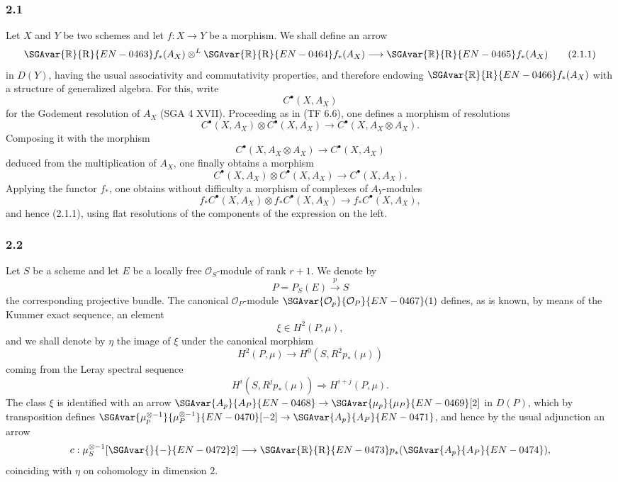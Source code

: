 \subsubsection*{2.1}
Let $X$ and $Y$ be two schemes and let $f:X\to Y$ be a morphism. We shall define an arrow
\[
\SGAvar{\mathbb{R}}{\mathrm{R}}{EN-0463}f_*(A_X)\otimes^L \SGAvar{\mathbb{R}}{\mathrm{R}}{EN-0464}f_*(A_X)\longrightarrow \SGAvar{\mathbb{R}}{\mathrm{R}}{EN-0465}f_*(A_X)
\tag{2.1.1}
\]
in $D(Y)$, having the usual associativity and commutativity properties, and therefore endowing $\SGAvar{\mathbb{R}}{\mathrm{R}}{EN-0466}f_*(A_X)$ with a structure of generalized algebra. For this, write
\[
C^{\bullet}(X,A_X)
\]
for the Godement resolution of $A_X$ (SGA 4 XVII). Proceeding as in (TF 6.6), one defines a morphism of resolutions
\[
C^{\bullet}(X,A_X)\otimes C^{\bullet}(X,A_X)\longrightarrow C^{\bullet}(X,A_X\otimes A_X).
\]
Composing it with the morphism
\[
C^{\bullet}(X,A_X\otimes A_X)\longrightarrow C^{\bullet}(X,A_X)
\]
deduced from the multiplication of $A_X$, one finally obtains a morphism
\[
C^{\bullet}(X,A_X)\otimes C^{\bullet}(X,A_X)\longrightarrow C^{\bullet}(X,A_X).
\tag{2.1.2}
\]
Applying the functor $f_*$, one obtains without difficulty a morphism of complexes of $A_Y$-modules
\[
f_*C^{\bullet}(X,A_X)\otimes f_*C^{\bullet}(X,A_X)\longrightarrow f_*C^{\bullet}(X,A_X),
\]
and hence (2.1.1), using flat resolutions of the components of the expression on the left.

\subsubsection*{2.2}
Let $S$ be a scheme and let $E$ be a locally free $\mathcal O_S$-module of rank $r+1$. We denote by
\[
P=P_S(E)\xrightarrow{p}S
\]
the corresponding projective bundle. The canonical $\mathcal O_P$-module $\SGAvar{\mathcal O_p}{\mathcal O_P}{EN-0467}(1)$ defines, as is known, by means of the Kummer exact sequence, an element
\[
\xi\in H^2(P,\mu),
\]
and we shall denote by $\eta$ the image of $\xi$ under the canonical morphism
\[
H^2(P,\mu)\longrightarrow H^0(S,R^2p_*(\mu))
\]
coming from the Leray spectral sequence
\[
H^i(S,R^jp_*(\mu))\Rightarrow H^{i+j}(P,\mu).
\]
The class $\xi$ is identified with an arrow $\SGAvar{A_p}{A_P}{EN-0468}\to\SGAvar{\mu_p}{\mu_P}{EN-0469}[2]$ in $D(P)$, which by transposition defines $\SGAvar{\mu_p^{\otimes -1}}{\mu_P^{\otimes -1}}{EN-0470}[-2]\to \SGAvar{A_p}{A_P}{EN-0471}$, and hence by the usual adjunction an arrow
\[
c:\mu_S^{\otimes -1}[\SGAvar{}{-}{EN-0472}2]\longrightarrow \SGAvar{\mathbb{R}}{\mathrm{R}}{EN-0473}p_*(\SGAvar{A_p}{A_P}{EN-0474}),
\]
coinciding with $\eta$ on cohomology in dimension $2$.

